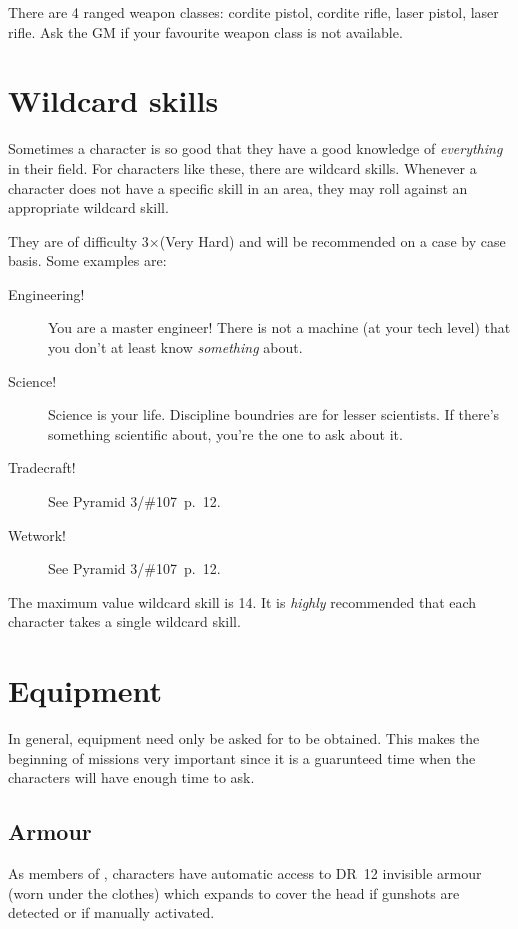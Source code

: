 There are 4 ranged weapon classes: cordite pistol, cordite rifle, laser pistol,
laser rifle. Ask the GM if your favourite weapon class is not available.

\section{Wildcard skills}
\label{sec:wildcard-skills}

  Sometimes a character is so good that they have a good knowledge of
  \emph{everything} in their field. For characters like these, there are
  wildcard skills. Whenever a character does not have a specific skill in an
  area, they may roll against an appropriate wildcard skill.

  They are of difficulty 3×(Very Hard) and will be recommended on a case by case
  basis. Some examples are:
  \begin{description}
  \item[Engineering!] You are a master engineer! There is not a machine (at your
    tech level) that you don't at least know \emph{something} about.
  \item[Science!] Science is your life. Discipline boundries are for lesser
    scientists. If there's something scientific about, you're the one to ask
    about it.
  \item[Tradecraft!] See Pyramid 3/\#107~p.~12.
  \item[Wetwork!] See Pyramid 3/\#107~p.~12.
  \end{description}

  The maximum value wildcard skill is 14. It is \emph{highly} recommended that
  each character takes a single wildcard skill.
  

\section{Equipment}

In general, equipment need only be asked for to be obtained. This makes the
beginning of missions very important since it is a guarunteed time when the
characters will have enough time to ask.

\subsection{Armour}
\label{sec:armour}

As members of \thecompany, characters have automatic access to DR~12 invisible
armour (worn under the clothes) which expands to cover the head if gunshots are
detected or if manually activated.

